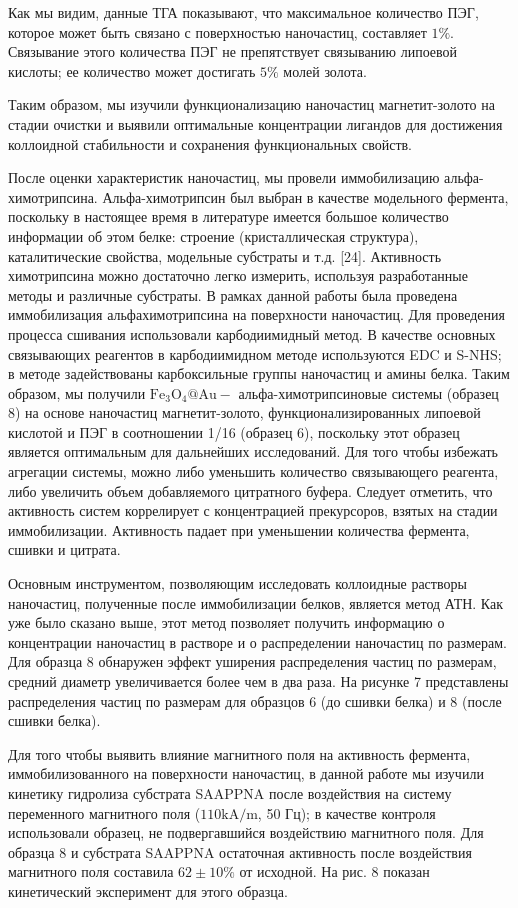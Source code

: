 \documentclass[12pt, a4paper]{article}
\begin{document}
Как мы видим, данные ТГА показывают, что максимальное количество ПЭГ, которое может быть связано с поверхностью наночастиц, составляет \(1 \%\). Связывание этого количества ПЭГ не препятствует связыванию липоевой кислоты; ее количество может достигать \(5 \%\) молей золота.

Таким образом, мы изучили функционализацию наночастиц магнетит-золото на стадии очистки и выявили оптимальные концентрации лигандов для достижения коллоидной стабильности и сохранения функциональных свойств.

После оценки характеристик наночастиц, мы провели иммобилизацию альфа-химотрипсина. Альфа-химотрипсин был выбран в качестве модельного фермента, поскольку в настоящее время в литературе имеется большое количество информации об этом белке: строение (кристаллическая структура), каталитические свойства, модельные субстраты и т.д. [24]. Активность химотрипсина можно достаточно легко измерить, используя разработанные методы и различные субстраты. В рамках данной работы была проведена иммобилизация альфахимотрипсина на поверхности наночастиц. Для проведения процесса сшивания использовали карбодиимидный метод. В качестве основных связывающих реагентов в карбодиимидном методе используются EDC и S-NHS; в методе задействованы карбоксильные группы наночастиц и амины белка. Таким образом, мы получили \(\mathrm{Fe}_{3} \mathrm{O}_{4} @ \mathrm{Au}-\) альфа-химотрипсиновые системы (образец 8) на основе наночастиц магнетит-золото, функционализированных липоевой кислотой и ПЭГ в соотношении 1/16 (образец 6), поскольку этот образец является оптимальным для дальнейших исследований. Для того чтобы избежать агрегации системы, можно либо уменьшить количество связывающего реагента, либо увеличить объем добавляемого цитратного буфера. Следует отметить, что активность систем коррелирует с концентрацией прекурсоров, взятых на стадии иммобилизации. Активность падает при уменьшении количества фермента, сшивки и цитрата.

Основным инструментом, позволяющим исследовать коллоидные растворы наночастиц, полученные после иммобилизации белков, является метод АТН. Как уже было сказано выше, этот метод позволяет получить информацию о концентрации наночастиц в растворе и о распределении наночастиц по размерам. Для образца 8 обнаружен эффект уширения распределения частиц по размерам, средний диаметр увеличивается более чем в два раза. На рисунке 7 представлены распределения частиц по размерам для образцов 6 (до сшивки белка) и 8 (после сшивки белка).

Для того чтобы выявить влияние магнитного поля на активность фермента, иммобилизованного на поверхности наночастиц, в данной работе мы изучили кинетику гидролиза субстрата SAAPPNA после воздействия на систему переменного магнитного поля (\(110 \mathrm{kA} / \mathrm{m}\), 50 Гц); в качестве контроля использовали образец, не подвергавшийся воздействию магнитного поля. Для образца 8 и субстрата SAAPPNA остаточная активность после воздействия магнитного поля составила \(62 \pm 10 \%\) от исходной. На рис. 8 показан кинетический эксперимент для этого образца.
\end{document}
